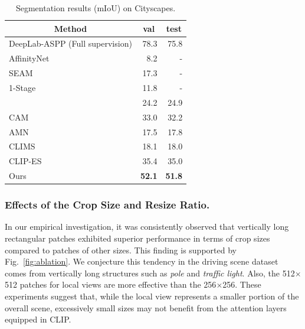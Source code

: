 \documentclass[letterpaper]{article} %
\begin{document}
\begin{table}[]
\normalsize
\centering
{\small
\begin{tabular}{@{}lrr@{}}
\toprule
\multicolumn{1}{c}{Method}                              & \multicolumn{1}{c}{val} & \multicolumn{1}{c}{test} \\ \midrule
\multicolumn{1}{l}{DeepLab-ASPP (Full supervision)} & 78.3 & \multicolumn{1}{r}{75.8} \\ \midrule
\multicolumn{1}{l}{AffinityNet} &  8.2 & \multicolumn{1}{r}{-} \\
\multicolumn{1}{l}{SEAM} & 17.3 & \multicolumn{1}{r}{-} \\
\multicolumn{1}{l}{1-Stage} & 11.8 & \multicolumn{1}{r}{-} \\
\multicolumn{1}{l}{\citeauthor{wang2020deep}} & 24.2 & \multicolumn{1}{r}{24.9}          \\
\multicolumn{1}{l}{CAM} & 33.0 & \multicolumn{1}{r}{32.2} \\
\multicolumn{1}{l}{AMN} & 17.5 & \multicolumn{1}{r}{17.8} \\
\multicolumn{1}{l}{CLIMS } & 18.1 & \multicolumn{1}{r}{18.0} \\
\multicolumn{1}{l}{CLIP-ES } & 35.4 & \multicolumn{1}{r}{35.0} \\ \midrule
\multicolumn{1}{l}{Ours}                                & \textbf{52.1}     & \multicolumn{1}{r}{\textbf{51.8}} \\ \bottomrule

\end{tabular}
}
\caption{Segmentation results (mIoU) on Cityscapes.}
\label{tab:seg_cityscapes}
\end{table}

\subsubsection{Effects of the Crop Size and Resize Ratio.} In our empirical investigation, it was consistently observed that vertically long rectangular patches exhibited superior performance in terms of crop sizes compared to patches of other sizes. This finding is supported by Fig.~\ref{fig:ablation}. We conjecture this tendency in the driving scene dataset comes from vertically long structures such as \textit{pole} and \textit{traffic light}. Also, the 512$\times$512 patches for local views are more effective than the 256$\times$256. These experiments suggest that, while the local view represents a smaller portion of the overall scene, excessively small sizes may not benefit from the attention layers equipped in CLIP.
\end{document}
